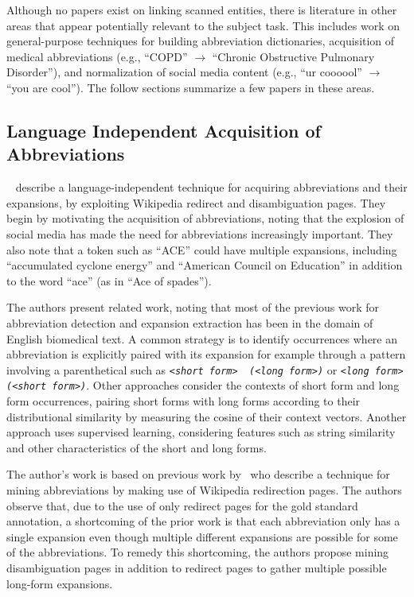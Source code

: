 \documentclass[11pt,a4paper]{article}
\begin{document}
Although no papers exist on linking scanned entities, there is
literature in other areas that appear potentially relevant to the
subject task.  This includes work on general-purpose techniques for
building abbreviation dictionaries, acquisition of medical
abbreviations (e.g., ``COPD'' $\rightarrow$ ``Chronic Obstructive Pulmonary
Disorder''), and normalization of social media content (e.g., ``ur
coooool'' $\rightarrow$ ``you are cool'').  The follow sections
summarize a few papers in these areas.

\subsection{Language Independent Acquisition of Abbreviations}
~\cite{DBLP:journals/corr/abs-1709-08074} describe a
language-independent technique for acquiring abbreviations and their
expansions, by exploiting Wikipedia redirect and disambiguation pages.
They begin by motivating the acquisition of abbreviations, noting that
the explosion of social media has made the need for abbreviations
increasingly important.  They also note that a token such as ``ACE''
could have multiple expansions, including ``accumulated cyclone
energy'' and ``American Council on Education'' in addition to the word
``ace'' (as in ``Ace of spades'').

The authors present related work, noting that most of the previous
work for abbreviation detection and expansion extraction has been in
the domain of English biomedical text.  A common strategy is to
identify occurrences where an abbreviation is explicitly paired with
its expansion for example through a pattern involving a parenthetical
such as {\em \verb|<short form>  (<long form>)|} or {\em
  \verb|<long form> (<short form>)|}.
Other approaches consider the contexts of short form and long form
occurrences, pairing short forms with long forms according to their
distributional similarity by measuring the cosine of their context
vectors.  Another approach uses supervised learning, considering
features such as string similarity and other characteristics of the
short and long forms.

The author’s work is based on previous work by~\cite{JACQUET14.468}
who describe a technique for mining abbreviations by making use of
Wikipedia redirection pages.  The authors observe that, due to the use
of only redirect pages for the gold standard annotation, a shortcoming
of the prior work is that each abbreviation only has a single
expansion even though multiple different expansions are possible for
some of the abbreviations.  To remedy this shortcoming, the authors
propose mining disambiguation pages in addition to redirect pages to
gather multiple possible long-form expansions.
\end{document}
